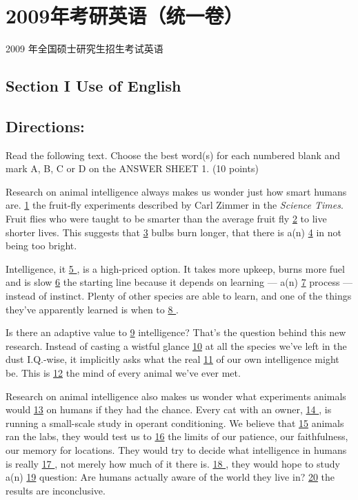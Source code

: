 \documentclass[UTF8,11pt]{ctexart}
\begin{document}
\section*{2009年考研英语（统一卷）}
2009 年全国硕士研究生招生考试英语


\subsection*{\textbf{Section I Use of English}}


\subsection*{\textbf{Directions:}}


Read the following text. Choose the best word(s) for each numbered blank and mark A, B, C or D on the ANSWER SHEET 1. (10 points)


Research on animal intelligence always makes us wonder just how smart humans are. \uline{1} the fruit-fly experiments described by Carl Zimmer in the \textit{Science Times}. Fruit flies who were taught to be smarter than the average fruit fly \uline{2} to live shorter lives. This suggests that \uline{3} bulbs burn longer, that there is a(n) \uline{4} in not being too bright.


Intelligence, it \uline{5 }, is a high-priced option. It takes more upkeep, burns more fuel and is slow \uline{6} the starting line because it depends on learning — a(n) \uline{7} process — instead of instinct. Plenty of other species are able to learn, and one of the things they’ve apparently learned is when to \uline{8 }.


Is there an adaptive value to \uline{9} intelligence? That’s the question behind this new research. Instead of casting a wistful glance \uline{10} at all the species we’ve left in the dust I.Q.-wise, it implicitly asks what the real \uline{11} of our own intelligence might be. This is \uline{12} the mind of every animal we’ve ever met.


Research on animal intelligence also makes us wonder what experiments animals would \uline{13} on humans if they had the chance. Every cat with an owner, \uline{14 }, is running a small-scale study in operant conditioning. We believe that \uline{15} animals ran the labs, they would test us to \uline{16} the limits of our patience, our faithfulness, our memory for locations. They would try to decide what intelligence in humans is really \uline{17 }, not merely how much of it there is. \uline{18 }, they would hope to study a(n) \uline{19} question: Are humans actually aware of the world they live in? \uline{20} the results are inconclusive.
\end{document}
